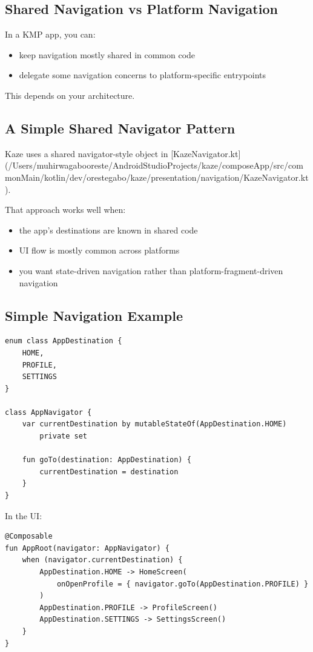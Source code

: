 \documentclass[11pt,a4paper]{article}
\begin{document}
\subsection{Shared Navigation vs Platform Navigation}

In a KMP app, you can:
\begin{itemize}
    \item keep navigation mostly shared in common code
    \item delegate some navigation concerns to platform-specific entrypoints
\end{itemize}

This depends on your architecture.

\subsection{A Simple Shared Navigator Pattern}

Kaze uses a shared navigator-style object in [KazeNavigator.kt](/Users/muhirwagabooreste/AndroidStudioProjects/kaze/composeApp/src/commonMain/kotlin/dev/orestegabo/kaze/presentation/navigation/KazeNavigator.kt).

That approach works well when:
\begin{itemize}
    \item the app's destinations are known in shared code
    \item UI flow is mostly common across platforms
    \item you want state-driven navigation rather than platform-fragment-driven navigation
\end{itemize}

\subsection{Simple Navigation Example}

\begin{lstlisting}[style=kazekotlin]
enum class AppDestination {
    HOME,
    PROFILE,
    SETTINGS
}

class AppNavigator {
    var currentDestination by mutableStateOf(AppDestination.HOME)
        private set

    fun goTo(destination: AppDestination) {
        currentDestination = destination
    }
}
\end{lstlisting}

In the UI:

\begin{lstlisting}[style=kazekotlin]
@Composable
fun AppRoot(navigator: AppNavigator) {
    when (navigator.currentDestination) {
        AppDestination.HOME -> HomeScreen(
            onOpenProfile = { navigator.goTo(AppDestination.PROFILE) }
        )
        AppDestination.PROFILE -> ProfileScreen()
        AppDestination.SETTINGS -> SettingsScreen()
    }
}
\end{lstlisting}
\end{document}
